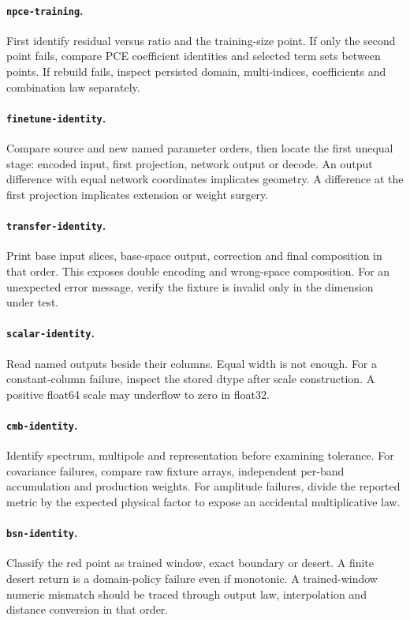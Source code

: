 \documentclass[10pt,aps,prd,twocolumn,nofootinbib]{revtex4-2}
\newcommand{\code}[1]{\texttt{#1}}
\begin{document}
\paragraph{\code{npce-training}.}
First identify residual versus ratio and the training-size point.  If only the
second point fails, compare PCE coefficient identities and selected term sets
between points.  If rebuild fails, inspect persisted domain, multi-indices,
coefficients and combination law separately.

\paragraph{\code{finetune-identity}.}
Compare source and new named parameter orders, then locate the first unequal
stage: encoded input, first projection, network output or decode.  An output
difference with equal network coordinates implicates geometry.  A difference
at the first projection implicates extension or weight surgery.

\paragraph{\code{transfer-identity}.}
Print base input slices, base-space output, correction and final composition
in that order.  This exposes double encoding and wrong-space composition.
For an unexpected error message, verify the fixture is invalid only in the
dimension under test.

\paragraph{\code{scalar-identity}.}
Read named outputs beside their columns.  Equal width is not enough.  For a
constant-column failure, inspect the stored dtype after scale construction.
A positive float64 scale may underflow to zero in float32.

\paragraph{\code{cmb-identity}.}
Identify spectrum, multipole and representation before examining tolerance.
For covariance failures, compare raw fixture arrays, independent per-band
accumulation and production weights.  For amplitude failures, divide the
reported metric by the expected physical factor to expose an accidental
multiplicative law.

\paragraph{\code{bsn-identity}.}
Classify the red point as trained window, exact boundary or desert.  A finite
desert return is a domain-policy failure even if monotonic.  A trained-window
numeric mismatch should be traced through output law, interpolation and
distance conversion in that order.
\end{document}
